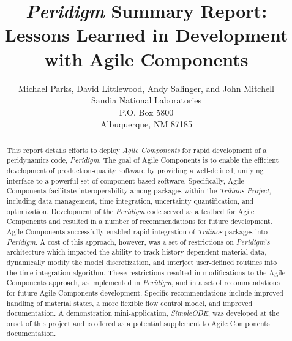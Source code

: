 \documentclass[pdf,ps2pdf,12pt,report]{SANDreport}
\title{\emph{Peridigm} Summary Report:\\Lessons Learned in Development with Agile Components}
\author{Michael Parks, David Littlewood, Andy Salinger, and John Mitchell \\
	  Sandia National Laboratories\\
	  P.O. Box 5800\\
	  Albuquerque, NM 87185 \\
	 }
\date{}
\theoremstyle{plain}
\theoremstyle{definition}
\theoremstyle{remark}
\numberwithin{equation}{section}
\begin{document}
    \maketitle

\begin{abstract}
This report details efforts to deploy \emph{Agile Components} for rapid development of a peridynamics code, \emph{Peridigm}.  The goal of Agile Components is to enable the efficient development of production-quality software by providing a well-defined, unifying interface to a powerful set of component-based software.  Specifically, Agile Components facilitate interoperability among packages within the \emph{Trilinos Project}, including data management, time integration, uncertainty quantification, and optimization.  Development of the \emph{Peridigm} code served as a testbed for Agile Components and resulted in a number of recommendations for future development.  Agile Components successfully enabled rapid integration of \emph{Trilinos} packages into \emph{Peridigm}.  A cost of this approach, however, was a set of restrictions on \emph{Peridigm}'s architecture which impacted the ability to track history-dependent material data, dynamically modify the model discretization, and interject user-defined routines into the time integration algorithm.  These restrictions resulted in modifications to the Agile Components approach, as implemented in \emph{Peridigm}, and in a set of recommendations for future Agile Components development.  Specific recommendations include improved handling of material states, a more flexible flow control model, and improved documentation.  A demonstration mini-application, \emph{SimpleODE}, was developed at the onset of this project and is offered as a potential supplement to Agile Components documentation.
\end{abstract}


    \cleardoublepage		%
    \tableofcontents
    \listoffigures


\end{document}

